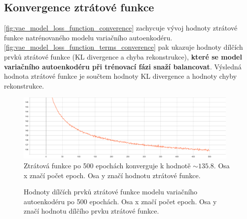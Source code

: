 \newpage
\subsection{Konvergence ztrátové funkce}
\autoref{fig:vae_model_loss_function_converence} zachycuje vývoj hodnoty ztrátové funkce natrénovaného modelu variačního autoenkodéru.
\autoref{fig:vae_model_loss_function_terms_converence} pak ukazuje hodnoty dílčích prvků ztrátové funkce (KL divergence a chyba rekonstrukce), \textbf{které se model variačního autoenkodéru při trénovací fázi snaží balancovat}.
Výsledná hodnota ztrátové funkce je součtem hodnoty KL divergence a hodnoty chyby rekonstrukce.

\begin{figure}[H]
    \centering
    \includegraphics[width=0.97\textwidth]{figures/vae_model_total_loss_500_epochs.pdf}
    \caption{Ztrátová funkce po 500 epochách konverguje k hodnotě $\sim 135.8$. Osa x značí počet epoch. Osa y značí hodnotu ztrátové funkce.}
    \label{fig:vae_model_loss_function_converence}
\end{figure}

\begin{figure}[H]
    \centering
    \qquad
    \caption{Hodnoty dílčích prvků ztrátové funkce modelu variačního autoenkodéru po 500 epochách. Osa x značí počet epoch. Osa y značí hodnotu dílčího prvku ztrátové funkce.}
    \label{fig:vae_model_loss_function_terms_converence}
\end{figure}

